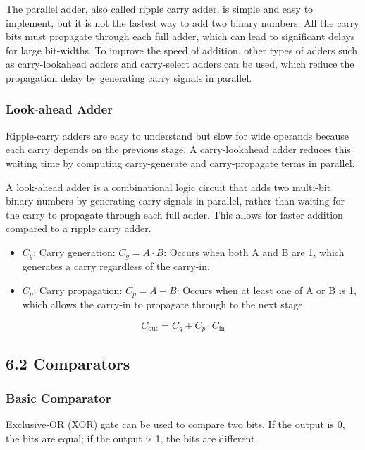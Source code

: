 \documentclass[11pt,a4paper]{article}
\begin{document}
The parallel adder, also called ripple carry adder, is simple and easy
to implement, but it is not the fastest way to add two binary numbers.
All the carry bits must propagate through each full adder, which can
lead to significant delays for large bit-widths. To improve the speed of
addition, other types of adders such as carry-lookahead adders and
carry-select adders can be used, which reduce the propagation delay by
generating carry signals in parallel.

\subsubsection{Look-ahead Adder}\label{look-ahead-adder}

Ripple-carry adders are easy to understand but slow for wide operands
because each carry depends on the previous stage. A carry-lookahead
adder reduces this waiting time by computing carry-generate and
carry-propagate terms in parallel.

A look-ahead adder is a combinational logic circuit that adds two
multi-bit binary numbers by generating carry signals in parallel, rather
than waiting for the carry to propagate through each full adder. This
allows for faster addition compared to a ripple carry adder.

\begin{itemize}
\item
  \(C_g\): Carry generation: \(C_g = A \cdot B\): Occurs when both A and
  B are 1, which generates a carry regardless of the carry-in.
\item
  \(C_p\): Carry propagation: \(C_p = A + B\): Occurs when at least one
  of A or B is 1, which allows the carry-in to propagate through to the
  next stage.
\end{itemize}

\[C_{\text{out}} = C_g + C_p \cdot C_{\text{in}} \]

\subsection{6.2 Comparators}\label{comparators}

\subsubsection{Basic Comparator}\label{basic-comparator}

Exclusive-OR (XOR) gate can be used to compare two bits. If the output
is 0, the bits are equal; if the output is 1, the bits are different.
\end{document}
